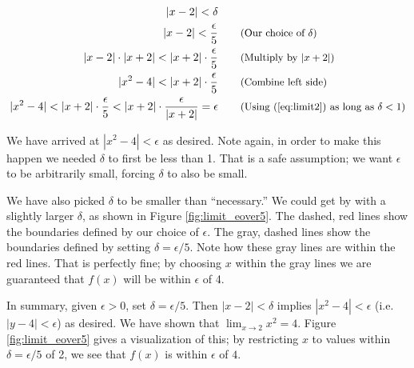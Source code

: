 {\small
\begin{eqnarray*}
|x - 2| < \delta &\\
|x - 2| < \frac{\epsilon}{5}& \qquad \text{\small(Our choice of $\delta$)}\\
|x - 2|\cdot|x + 2| < |x + 2|\cdot\frac{\epsilon}{5}& \qquad \text{\small(Multiply by $|x+2|$)}\\
|x^2 - 4|< |x + 2|\cdot\frac{\epsilon}{5}& \qquad \text{\small(Combine left side)}\\
|x^2 - 4|< |x + 2|\cdot\frac{\epsilon}{5} <|x + 2|\cdot\frac{\epsilon}{|x+2|}=\epsilon & \qquad 
\text{\small(Using (\ref{eq:limit2}) as long as $\delta <1$)}
\end{eqnarray*}
\normalsize

We have arrived at $|x^2 - 4|<\epsilon$ as desired.  Note again, in order to make this happen we needed $\delta$ to first be less than 1.  That is a safe assumption; we want $\epsilon$ to be arbitrarily small, forcing $\delta$ to also be small. 

We have also picked $\delta$ to be smaller than ``necessary.'' We could get by with a slightly larger $\delta$, as shown in Figure \ref{fig:limit_eover5}. The dashed, red lines show the boundaries defined by our choice of $\epsilon$. The gray, dashed lines show the boundaries defined by setting $\delta = \epsilon/5$. Note how these gray lines are within the red lines. That is perfectly fine; by choosing $x$ within the gray lines we are guaranteed that $f(x)$ will be within $\epsilon$ of 4.%


In summary, given $\epsilon > 0$, set $\delta=\epsilon/5$.  Then $|x - 2| < \delta$ implies 
$|x^2 - 4|< \epsilon$ (i.e. $|y - 4|< \epsilon$) as desired.  We have shown that $\displaystyle \lim_{x\rightarrow 2} x^2 = 4 $. Figure \ref{fig:limit_eover5} gives a visualization of this; by restricting $x$ to values within $\delta = \epsilon/5$ of 2, we see that $f(x)$ is within $\epsilon$ of $4$.
}\\

